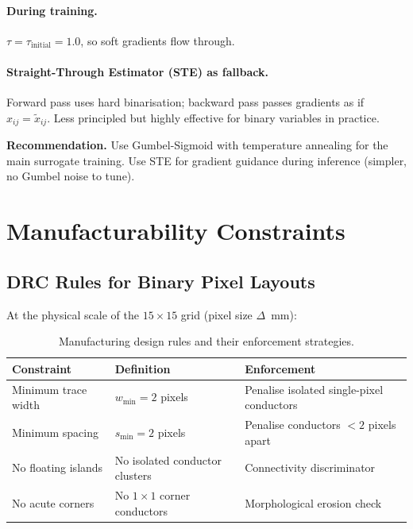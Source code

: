 \documentclass[12pt,a4paper]{article}
\newcommand{\xtilde}{\tilde{x}}
\newcommand{\NOTE}[1]{\begin{tcolorbox}[notebox]#1\end{tcolorbox}}
\theoremstyle{definition}
\theoremstyle{plain}
\theoremstyle{remark}
\begin{document}
\paragraph{During training.}
$\tau = \tau_{\mathrm{initial}} = 1.0$, so soft gradients flow through.

\paragraph{Straight-Through Estimator (STE) as fallback.}
Forward pass uses hard binarisation;
backward pass passes gradients as if $x_{ij} = \xtilde_{ij}$.
Less principled but highly effective for binary variables in practice.

\NOTE{\textbf{Recommendation.}
Use Gumbel-Sigmoid with temperature annealing for the main surrogate training.
Use STE for gradient guidance during inference (simpler, no Gumbel noise to tune).}

\section{Manufacturability Constraints}
\label{sec:mfg}

\subsection{DRC Rules for Binary Pixel Layouts}

At the physical scale of the $15\times15$ grid (pixel size $\Delta$~mm):

\begin{table}[H]
\centering
\caption{Manufacturing design rules and their enforcement strategies.}
\label{tab:drc}
\begin{tabular}{lll}
\toprule
\textbf{Constraint} & \textbf{Definition} & \textbf{Enforcement} \\
\midrule
Minimum trace width  & $w_{\min} = 2$ pixels        & Penalise isolated single-pixel conductors \\
Minimum spacing      & $s_{\min} = 2$ pixels        & Penalise conductors $<2$ pixels apart \\
No floating islands  & No isolated conductor clusters & Connectivity discriminator \\
No acute corners     & No $1\times1$ corner conductors & Morphological erosion check \\
\bottomrule
\end{tabular}
\end{table}
\end{document}
